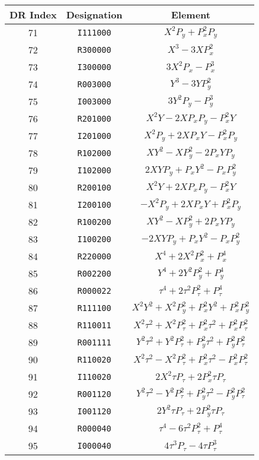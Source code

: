 {{\begin{center}
\newpage
\begin{tabular}{ccc}
DR Index&Designation&Element\\ \hline
   71&{\tt I111000}&$X^{2}P_y+P_x^{2}P_y$\\
   72&{\tt R300000}&$X^{3}-3XP_x^{2}$\\
   73&{\tt I300000}&$3X^{2}P_x-P_x^{3}$\\
   74&{\tt R003000}&$Y^{3}-3YP_y^{2}$\\
   75&{\tt I003000}&$3Y^{2}P_y-P_y^{3}$\\
   76&{\tt R201000}&$X^{2}Y-2XP_xP_y-P_x^{2}Y$\\
   77&{\tt I201000}&$X^{2}P_y+2XP_xY-P_x^{2}P_y$\\
   78&{\tt R102000}&$XY^{2}-XP_y^{2}-2P_xYP_y$\\
   79&{\tt I102000}&$2XYP_y+P_xY^{2}-P_xP_y^{2}$\\
   80&{\tt R200100}&$X^{2}Y+2XP_xP_y-P_x^{2}Y$\\
   81&{\tt I200100}&$-X^{2}P_y+2XP_xY+P_x^{2}P_y$\\
   82&{\tt R100200}&$XY^{2}-XP_y^{2}+2P_xYP_y$\\
   83&{\tt I100200}&$-2XYP_y+P_xY^{2}-P_xP_y^{2}$\\
   84&{\tt R220000}&$X^{4}+2X^{2}P_x^{2}+P_x^{4}$\\
   85&{\tt R002200}&$Y^{4}+2Y^{2}P_y^{2}+P_y^{4}$\\
   86&{\tt R000022}&${\tau}^{4}+2{\tau}^{2}P_{\tau}^{2}+P_{\tau}^{4}$\\
   87&{\tt R111100}&$X^{2}Y^{2}+X^{2}P_y^{2}+P_x^{2}Y^{2}+P_x^{2}P_y^{2}$\\
   88&{\tt R110011}&$X^{2}{\tau}^{2}+X^{2}P_{\tau}^{2}+P_x^{2}{\tau}^{2}+P_x^{2}P_{\tau}^{2}$\\
   89&{\tt R001111}&$Y^{2}{\tau}^{2}+Y^{2}P_{\tau}^{2}+P_y^{2}{\tau}^{2}+P_y^{2}P_{\tau}^{2}$\\
   90&{\tt R110020}&$X^{2}{\tau}^{2}-X^{2}P_{\tau}^{2}+P_x^{2}{\tau}^{2}-P_x^{2}P_{\tau}^{2}$\\
   91&{\tt I110020}&$2X^{2}{\tau}P_{\tau}+2P_x^{2}{\tau}P_{\tau}$\\
   92&{\tt R001120}&$Y^{2}{\tau}^{2}-Y^{2}P_{\tau}^{2}+P_y^{2}{\tau}^{2}-P_y^{2}P_{\tau}^{2}$\\
   93&{\tt I001120}&$2Y^{2}{\tau}P_{\tau}+2P_y^{2}{\tau}P_{\tau}$\\
   94&{\tt R000040}&${\tau}^{4}-6{\tau}^{2}P_{\tau}^{2}+P_{\tau}^{4}$\\
   95&{\tt I000040}&$4{\tau}^{3}P_{\tau}-4{\tau}P_{\tau}^{3}$\\

\end{tabular}
\end{center}}}

